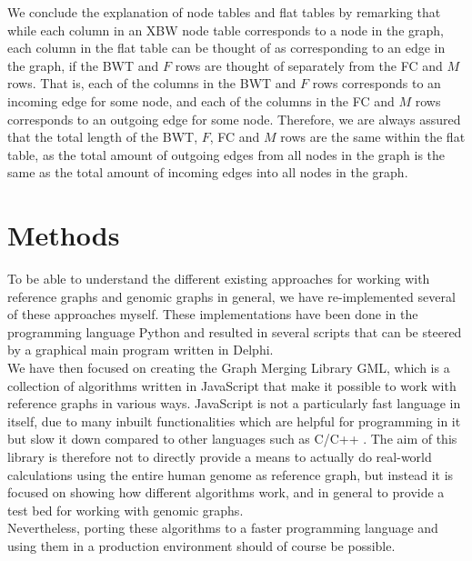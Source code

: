 \documentclass[a4paper,12pt,twoside,BCOR=10mm]{scrbook}
\begin{document}
We conclude the explanation of node tables and flat tables by remarking that while each column 
in an XBW node table corresponds to a node in the graph, 
each column in the flat table can be thought of as corresponding to an edge in the graph, 
if the BWT and $ F $ rows are thought of separately from the FC and $ M $ rows. 
That is, each of the columns in the BWT and $ F $ rows corresponds to an incoming edge for some node, 
and each of the columns in the FC and $ M $ rows corresponds to an outgoing edge for some node. 
Therefore, we are always assured that the total length of the BWT, $ F $, FC and $ M $ rows are the same 
within the flat table, as the total amount of outgoing edges from all nodes in the graph is 
the same as the total amount of incoming edges into all nodes in the graph.

\chapter{Methods}
%

To be able to understand the different existing approaches for working with 
reference graphs and genomic graphs in general, we have re-implemented several 
of these approaches myself. These implementations have been done in the programming 
language Python and resulted in several scripts that can be steered 
by a graphical main program written in Delphi. \\
We have then focused on creating the Graph Merging Library GML, which is a 
collection of algorithms written in JavaScript that make it possible to 
work with reference graphs in various ways. JavaScript is not a particularly fast 
language in itself, due to many inbuilt functionalities which are helpful for programming 
in it but slow it down compared to other languages such as C/C++ \citep{Taivalsaari2008}. 
The aim of this library is therefore not to directly provide a means to actually do 
real-world calculations using the entire human genome as reference graph, 
but instead it is focused on showing how different algorithms work, 
and in general to provide a test bed for working with genomic graphs. \\
Nevertheless, porting these algorithms to a faster programming language 
and using them in a production environment should of course be possible.
\end{document}

